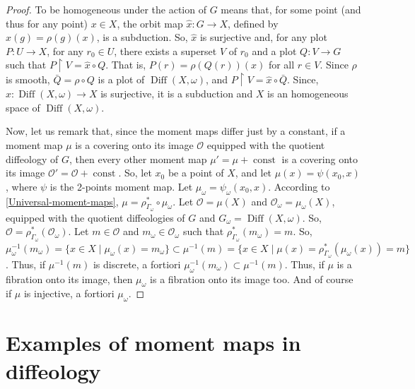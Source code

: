 \documentclass[10pt,reqno,twoside]{amsart}
\newcommand{\cO}{\mathcal{O}}
\DeclareMathOperator{\Diff}{Diff}
\DeclareMathOperator{\const}{const}
\theoremstyle{plain}
\theoremstyle{definition}
\begin{document}
  \begin{proof}
    To be homogeneous under the action of $G$ means that,
    for some point (and thus for any point) $x \in X$,
    the orbit map $\hat x : G \to X$,
    defined by $\hat x (g) = \rho(g)(x)$,
    is a subduction.
    So,
    $\hat x$ is surjective and,
    for any plot $P : U \to X$,
    for any $r_0 \in U$,
    there exists a superset $V$ of $r_0$ and a plot $Q : V \to G$ such that $P \restriction V = \hat x \circ Q$.
    That is,
    $P (r) = \rho(Q(r))(x)$ for all $r \in V$.
    Since $\rho$ is smooth,
    $\bar Q = \rho \circ Q$ is a plot of $\Diff(X,\omega)$,
    and $P \restriction V = \hat x \circ \bar Q$.
    Since,
    $\hat x : \Diff(X,\omega) \to X$ is surjective,
    it is a subduction and $X$ is an homogeneous space of $\Diff(X,\omega)$.
    
    Now,
    let us remark that,
    since the moment maps differ just by a constant,
    if a moment map $\mu$ is a covering onto its image $\cO$ equipped with the quotient diffeology of $G$,
    then every other moment map $\mu' = \mu + \const$ is a covering onto its image $\cO' = \cO + \const$.
    So,
    let $x_0$ be a point of $X$,
    and let $\mu(x) = \psi(x_0,x)$,
    where $\psi$ is the 2-points moment map.
    Let $\mu_\omega = \psi_\omega(x_0,x)$.
    According to \ref{Universal-moment-maps},
    $\mu = \rho^*_{\Gamma_\omega} \circ \mu_\omega$.
    Let $\cO = \mu(X)$ and $\cO_\omega = \mu_\omega(X)$,
    equipped with the quotient diffeologies of $G$ and $G_\omega = \Diff(X,\omega)$.
    So,
    $\cO = \rho^*_{\Gamma_\omega}(\cO_\omega)$.
    Let $m \in \cO$ and $m_\omega \in \cO_\omega$ such that $\rho^*_{\Gamma_\omega}(m_\omega) = m$.
    So,
    $\mu_\omega^{-1}(m_\omega) = \{x \in X \mid \mu_\omega(x) = m_\omega \} \subset \mu^{-1}(m) = \{ x \in X \mid \mu(x) = \rho^*_{\Gamma_\omega}(\mu_\omega(x)) = m \}$.
    Thus,
    if $\mu^{-1}(m)$ is discrete,
    a fortiori $\mu_\omega^{-1}(m_\omega) \subset \mu^{-1}(m)$.
    Thus,
    if $\mu$ is a fibration onto its image,
    then $\mu_\omega$ is a fibration onto its image too.
    And of course if $\mu$ is injective,
    a fortiori $\mu_\omega$.
  \end{proof}
  
  \section{Examples of moment maps in diffeology}
  \label{Examples-of-moment-maps-in-diffeology}
  
\end{document}
